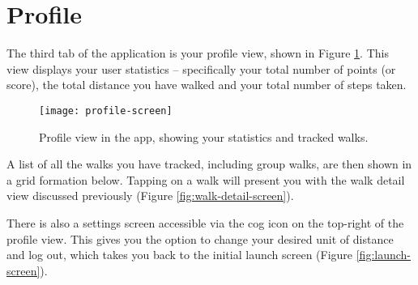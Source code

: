 \section{Profile}

The third tab of the application is your profile view, shown in Figure \ref{fig:profile-screen}. This view displays your user statistics -- specifically your total number of points (or score), the total distance you have walked and your total number of steps taken.

\begin{figure}[hbt]
  \centering
  \texttt{[image: profile-screen]}
  \caption{Profile view in the app, showing your statistics and tracked walks.}
  \label{fig:profile-screen}
\end{figure}


A list of all the walks you have tracked, including group walks, are then shown in a grid formation below. Tapping on a walk will present you with the walk detail view discussed previously (Figure \ref{fig:walk-detail-screen}).

There is also a settings screen accessible via the cog icon on the top-right of the profile view. This gives you the option to change your desired unit of distance and log out, which takes you back to the initial launch screen (Figure \ref{fig:launch-screen}).




